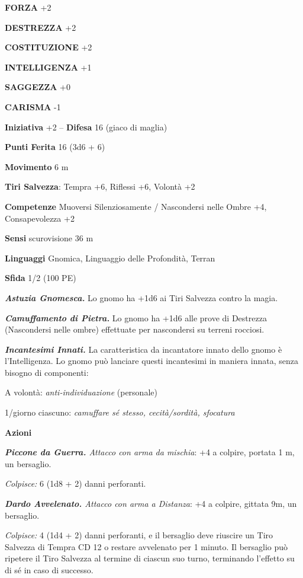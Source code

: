 \begin{multicols}{2}
\textbf{FORZA} +2

\textbf{DESTREZZA} +2

\textbf{COSTITUZIONE} +2

\textbf{INTELLIGENZA} +1

\textbf{SAGGEZZA} +0

\textbf{CARISMA} -1

\textbf{Iniziativa} +2 -- \textbf{Difesa} 16 (giaco di maglia)

\textbf{Punti Ferita} 16 (3d6 + 6)

\textbf{Movimento} 6 m

\textbf{Tiri Salvezza}: Tempra +6, Riflessi +6, Volontà +2

\textbf{Competenze} Muoversi Silenziosamente / Nascondersi nelle Ombre +4, Consapevolezza +2

\textbf{Sensi} scurovisione 36 m

\textbf{Linguaggi} Gnomica, Linguaggio delle Profondità, Terran

\textbf{Sfida} 1/2 (100 PE)

\emph{\textbf{Astuzia Gnomesca.}} Lo gnomo ha +1d6 ai Tiri Salvezza contro la magia.

\emph{\textbf{Camuffamento di Pietra.}} Lo gnomo ha +1d6 alle prove di Destrezza (Nascondersi nelle ombre) effettuate per nascondersi su terreni rocciosi.

\emph{\textbf{Incantesimi Innati.}} La caratteristica da incantatore innato dello gnomo è l'Intelligenza. Lo gnomo può lanciare questi incantesimi in maniera innata, senza bisogno di componenti:

A volontà: \emph{anti-individuazione} (personale)

1/giorno ciascuno: \emph{camuffare sé stesso, cecità/sordità, sfocatura}

\textbf{Azioni}

\emph{\textbf{Piccone da Guerra.} Attacco con arma da mischia}: +4 a colpire, portata 1 m, un bersaglio.

\emph{Colpisce:} 6 (1d8 + 2) danni perforanti.

\emph{\textbf{Dardo Avvelenato.} Attacco con arma a Distanza}: +4 a colpire, gittata 9m, un bersaglio.

\emph{Colpisce:} 4 (1d4 + 2) danni perforanti, e il bersaglio deve riuscire un Tiro Salvezza di Tempra CD 12 o restare avvelenato per 1 minuto. Il bersaglio può ripetere il Tiro Salvezza al termine di ciascun suo turno, terminando l'effetto su di sé in caso di successo.


\end{multicols}
